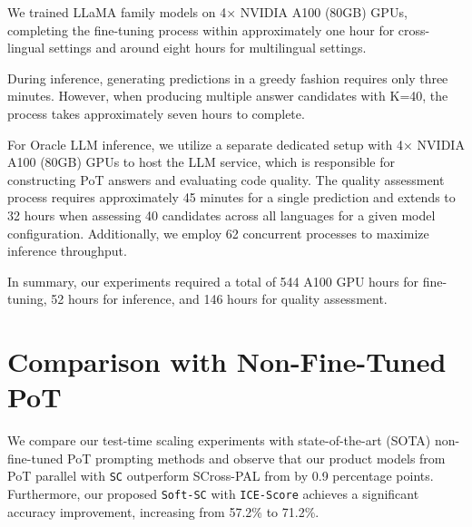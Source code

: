 We trained LLaMA family models on 4× NVIDIA A100 (80GB) GPUs, completing the fine-tuning process within approximately one hour for cross-lingual settings and around eight hours for multilingual settings.

During inference, generating predictions in a greedy fashion requires only three minutes. However, when producing multiple answer candidates with K=40, the process takes approximately seven hours to complete.

For Oracle LLM inference, we utilize a separate dedicated setup with 4× NVIDIA A100 (80GB) GPUs to host the LLM service, which is responsible for constructing PoT answers and evaluating code quality. The quality assessment process requires approximately 45 minutes for a single prediction and extends to 32 hours when assessing 40 candidates across all languages for a given model configuration. Additionally, we employ 62 concurrent processes to maximize inference throughput.

In summary, our experiments required a total of 544 A100 GPU hours for fine-tuning, 52 hours for inference, and 146 hours for quality assessment.




\section{Comparison with Non-Fine-Tuned PoT}

We compare our test-time scaling experiments with state-of-the-art (SOTA) non-fine-tuned PoT prompting methods and observe that our product models from PoT parallel with \texttt{SC} outperform SCross-PAL from \citet{crosspal} by 0.9 percentage points.
Furthermore, our proposed \texttt{Soft-SC} with \texttt{ICE-Score} achieves a significant accuracy improvement, increasing from 57.2\% to 71.2\%.


